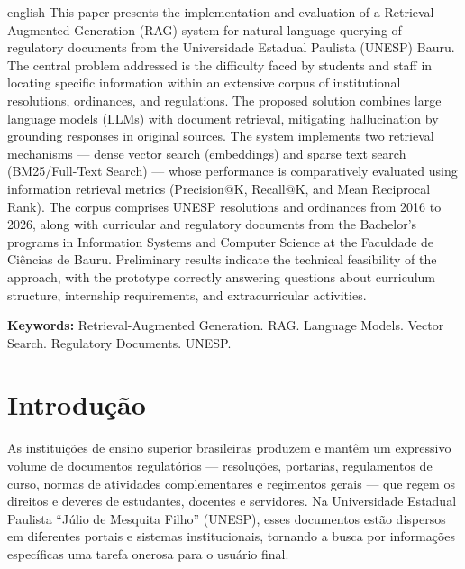 \documentclass[
  12pt,
  openright,
  twoside,
  a4paper,
  brazil
]{abntex2}
\begin{document}
\begin{resumo}[Abstract]
\begin{otherlanguage*}{english}
This paper presents the implementation and evaluation of a Retrieval-Augmented Generation (RAG) system for natural language querying of regulatory documents from the Universidade Estadual Paulista (UNESP) Bauru. The central problem addressed is the difficulty faced by students and staff in locating specific information within an extensive corpus of institutional resolutions, ordinances, and regulations. The proposed solution combines large language models (LLMs) with document retrieval, mitigating hallucination by grounding responses in original sources. The system implements two retrieval mechanisms --- dense vector search (embeddings) and sparse text search (BM25/Full-Text Search) --- whose performance is comparatively evaluated using information retrieval metrics (Precision@K, Recall@K, and Mean Reciprocal Rank). The corpus comprises UNESP resolutions and ordinances from 2016 to 2026, along with curricular and regulatory documents from the Bachelor's programs in Information Systems and Computer Science at the Faculdade de Ciências de Bauru. Preliminary results indicate the technical feasibility of the approach, with the prototype correctly answering questions about curriculum structure, internship requirements, and extracurricular activities.

\vspace{\onelineskip}
\noindent\textbf{Keywords:} Retrieval-Augmented Generation. RAG. Language Models. Vector Search. Regulatory Documents. UNESP.
\end{otherlanguage*}
\end{resumo}

\tableofcontents*
\cleardoublepage

\textual

\chapter{Introdução}

As instituições de ensino superior brasileiras produzem e mantêm um expressivo volume de documentos regulatórios --- resoluções, portarias, regulamentos de curso, normas de atividades complementares e regimentos gerais --- que regem os direitos e deveres de estudantes, docentes e servidores. Na Universidade Estadual Paulista ``Júlio de Mesquita Filho'' (UNESP), esses documentos estão dispersos em diferentes portais e sistemas institucionais, tornando a busca por informações específicas uma tarefa onerosa para o usuário final.
\end{document}
